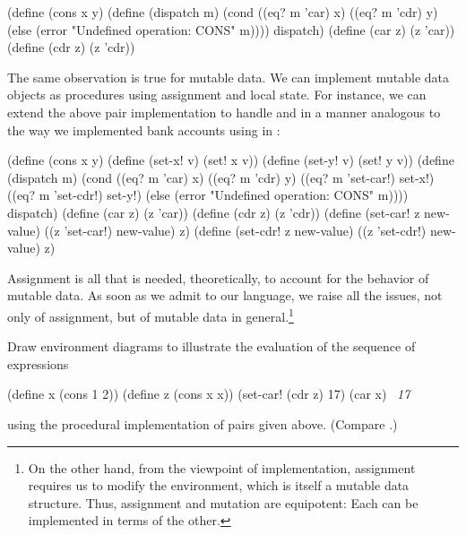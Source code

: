 \begin{codeBlock}
(define (cons x y)
  (define (dispatch m)
    (cond ((eq? m 'car) x)
          ((eq? m 'cdr) y)
          (else (error "Undefined operation: CONS" m))))
  dispatch)
(define (car z) (z 'car))
(define (cdr z) (z 'cdr))
\end{codeBlock}

\noindent
The same observation is true for mutable data.  We can implement mutable data
objects as procedures using assignment and local state.  For instance, we can
extend the above pair implementation to handle  and
 in a manner analogous to the way we implemented bank accounts
using  in :

\begin{codeBlock}
(define (cons x y)
  (define (set-x! v) (set! x v))
  (define (set-y! v) (set! y v))
  (define (dispatch m)
    (cond ((eq? m 'car) x)
          ((eq? m 'cdr) y)
          ((eq? m 'set-car!) set-x!)
          ((eq? m 'set-cdr!) set-y!)
          (else
           (error "Undefined operation: CONS" m))))
  dispatch)
(define (car z) (z 'car))
(define (cdr z) (z 'cdr))
(define (set-car! z new-value)
  ((z 'set-car!) new-value) z)
(define (set-cdr! z new-value)
  ((z 'set-cdr!) new-value) z)
\end{codeBlock}

\noindent
Assignment is all that is needed, theoretically, to account for the behavior of
mutable data.  As soon as we admit  to our language, we raise all
the issues, not only of assignment, but of mutable data in general.\footnote{On
the other hand, from the viewpoint of implementation, assignment requires us to
modify the environment, which is itself a mutable data structure.  Thus,
assignment and mutation are equipotent: Each can be implemented in terms of the
other.}

\begin{exerciseGroup}
\label{Exercise 3.20}
 Draw environment diagrams to
illustrate the evaluation of the sequence of expressions

\begin{codeBlock}
(define x (cons 1 2))
(define z (cons x x))
(set-car! (cdr z) 17)
(car x)
~\textit{17}~
\end{codeBlock}

\noindent
using the procedural implementation of pairs given above.  (Compare
.)
\end{exerciseGroup}

